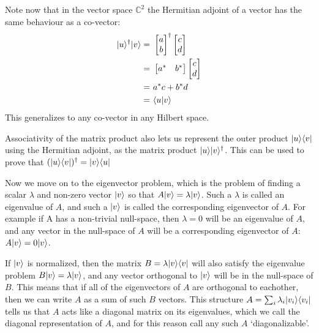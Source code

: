 Note now that in the vector space $\mathbb{C}^2$ the Hermitian adjoint of a vector has the same behaviour as a co-vector:
\begin{align*}
	\ket{u}^\dagger\ket{v}
	=&\ 
	\left[\begin{matrix}
		a\\
		b
	\end{matrix}\right]^\dagger
	\left[\begin{matrix}
		c\\
		d
	\end{matrix}\right]
	\\=&\ 
	\left[\begin{matrix}
		a^*&b^*
	\end{matrix}\right]
	\left[\begin{matrix}
		c\\
		d
	\end{matrix}\right]
	\\=&\ a^*c+b^*d
	\\=&\ \braket{u}{v}
\end{align*}
This generalizes to any co-vector in any Hilbert space.

Associativity of the matrix product also lets us represent the outer product $| u \rangle\langle v |$ using the Hermitian adjoint, as the matrix product $| u \rangle| v \rangle^\dagger$. This can be used to prove that
$(| u \rangle\langle v |)^\dagger = | v \rangle\langle u |$

Now we move on to the eigenvector problem, which is the problem of finding a scalar $\lambda$ and non-zero vector $| v \rangle$ so that $A| v \rangle=\lambda| v \rangle$. Such a $\lambda$ is called an eigenvalue of $A$, and such a $| v \rangle$ is called the corresponding eigenvector of $A$. For example if A has a non-trivial null-space, then $\lambda=0$ will be an eigenvalue of $A$, and any vector in the null-space of $A$ will be a corresponding eigenvector of $A$: $A| v \rangle = 0| v \rangle$.

If $| v \rangle$ is normalized, then the matrix $B=\lambda| v \rangle\langle v |$ will also satisfy the eigenvalue problem $B| v \rangle=\lambda| v \rangle$, and any vector orthogonal to $| v \rangle$ will be in the null-space of $B$. This means that if all of the eigenvectors of $A$ are orthogonal to eachother, then we can write $A$ as a sum of such $B$ vectors. This structure $A = \sum_i \lambda_i | v_i \rangle\langle v_i |$ tells us that $A$ acts like a diagonal matrix on its eigenvalues, which we call the diagonal representation of $A$, and for this reason call any such $A$ `diagonalizable'.

